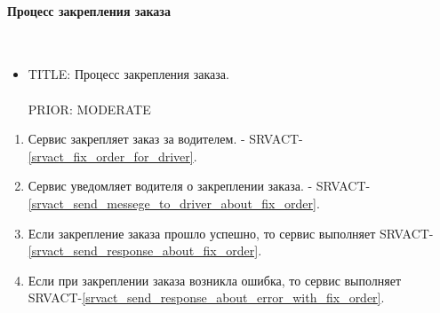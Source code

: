     \paragraph{Процесс закрепления заказа} \mbox{} \\

        \begin{itemize}

	        \item {
	          TITLE: Процесс закрепления заказа.\\
	          \\
	          PRIOR: MODERATE\\
	        }

     	   \end{itemize}

        \begin{alg} \label{alg_order_fastening} \mbox{}

	        \begin{enumerate}

	          \item Сервис закрепляет заказ за водителем. - SRVACT-\ref{srvact_fix_order_for_driver}.

	          \item Сервис уведомляет водителя о закреплении заказа. - SRVACT-\ref{srvact_send_messege_to_driver_about_fix_order}.
	          
	          \item Если закрепление заказа прошло успешно, то сервис выполняет SRVACT-\ref{srvact_send_response_about_fix_order}. 

	          \item Если при закреплении заказа возникла ошибка, то сервис выполняет SRVACT-\ref{srvact_send_response_about_error_with_fix_order}. 
	        \end{enumerate}

        	\end{alg}

